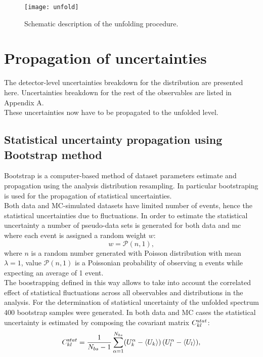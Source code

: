 \begin{figure}[htpb]
	\centering
	\texttt{[image: unfold]}
	\caption[Unfolding]{Schematic description of the unfolding procedure.}
	\label{fig::unfolding}
\end{figure}

\section{Propagation of uncertainties}
The detector-level uncertainties breakdown for the \pt distribution are presented here. Uncertainties breakdown for the rest of the observables are listed in Appendix A. \\
These uncertainties now have to be propagated to the unfolded level. 
\subsection{Statistical uncertainty propagation using Bootstrap method}
Bootstrap is a computer-based method of dataset parameters estimate and propagation using the analysis distribution resampling. In particular bootstraping is used for the propagation of statistical uncertainties. \\
Both data and MC-simulated datasets have limited number of events, hence the statistical uncertainties due to fluctuations. In order to estimate the statistical uncertainty a number of pseudo-data sets is generated for both data and \gls{mc} where each event is assigned a random weight $w$:
\begin{equation}
w = \mathcal{P}(n,1),
\end{equation}
where $n$ is a random number generated with Poisson distribution with mean $\lambda=1$, value $\mathcal{P}(n,1)$ is a Poissonian probability of observing n events while expecting an average of 1 event.\\
The boostrapping defined in this way allows to take into account the correlated effect of statistical fluctuations across all observables and distributions in the analysis. For the determination of statistical uncertainty of the unfolded spectrum 400 bootstrap samples were generated.
In both data and MC cases the statistical uncertainty is estimated by composing the covariant matrix $C_{kl}^{\textrm stat}$:
\begin{equation}
C_{kl}^{\textrm stat} = \frac{1}{N_{bs}-1} \sum_{\alpha=1}^{N_{bs}} (U^\alpha_k-\langle{U}_k\rangle) \, (U^\alpha_l-\langle{U}_l\rangle),
\label{eq:covexpr}
\end{equation}
